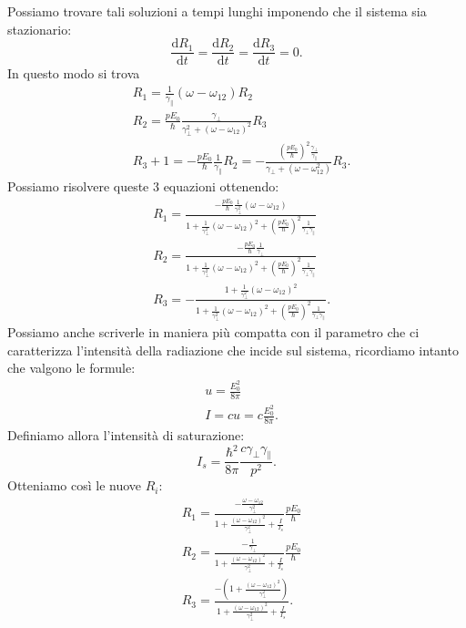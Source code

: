 Possiamo trovare tali soluzioni a tempi lunghi imponendo che il sistema sia stazionario:
\[
\frac{\text{d} R_1}{\text{d} t} =\frac{\text{d} R_2}{\text{d} t} = 
\frac{\text{d} R_3}{\text{d} t} =0
.\] 
In questo modo si trova 
\[\begin{aligned}
    &R_1 = \frac{1}{\gamma_\parallel}\left(\omega-\omega_{12}\right)R_2\\
    &R_2=\frac{pE_0}{\hbar }
    \frac{\gamma_\perp}{\gamma_\perp^2+\left(\omega-\omega_{12}\right)^2}R_3\\
    &R_3+1=-\frac{pE_0}{\hbar  }\frac{1}{\gamma_\parallel}R_2 =
    -\frac{\left(\frac{pE_0}{\hbar }\right)^2
	\frac{\gamma_\perp}
    {\gamma_\parallel}}{\gamma_\perp +\left(\omega-\omega_{12}^2\right)}R_3
.\end{aligned}\]
Possiamo risolvere queste 3 equazioni ottenendo:
\[\begin{aligned}
    &R_1= \frac{-\frac{pE_0}{\hbar  }\frac{1}{\gamma_\perp^2}
    \left(\omega-\omega_{12}\right)}
    {1+\frac{1}{\gamma_\perp^2}\left(\omega-\omega_{12}\right)^2 
    + \left(\frac{pE_0}{\hbar }\right)^2 
	\frac{1}{\gamma_\perp\gamma_\parallel}}\\
    &R_2 = \frac{- \frac{pE_0}{\hbar }\frac{1}{\gamma_\perp}}
{1+\frac{1}{\gamma_\perp^2}\left(\omega-\omega_{12}\right)^2 
    + \left(\frac{pE_0}{\hbar }\right)^2 
	\frac{1}{\gamma_\perp\gamma_\parallel}}\\
    &R_3 = - \frac{1+ \frac{1}{\gamma_\perp^2}\left(\omega-\omega_{12}\right)^2}
    {1+\frac{1}{\gamma_\perp^2}\left(\omega-\omega_{12}\right)^2 
    + \left(\frac{pE_0}{\hbar }\right)^2 
	\frac{1}{\gamma_\perp\gamma_\parallel}}
.\end{aligned}\]
Possiamo anche scriverle in maniera più compatta con il parametro che ci caratterizza l'intensità della radiazione che incide sul sistema, ricordiamo intanto che valgono le formule:
\[\begin{aligned}
&u = \frac{E_0^2}{8\pi}\\
&I = cu = c \frac{E_0^2}{8\pi}
.\end{aligned}\]
Definiamo allora l'intensità di saturazione:
\[
I_s = \frac{\hbar ^2}{8\pi}\frac{c\gamma_\perp\gamma_\parallel}{p^2}
.\] 
Otteniamo così le nuove $R_i$:
\[\begin{aligned}
    &R_1= \frac{-\frac{\omega-\omega_{12}}{\gamma_\perp^2}}
    {1+ \frac{\left(\omega-\omega_{12}\right)^2}{\gamma_\perp^2}
    + \frac{I}{I_s}} 
    \frac{pE_0}{\hbar }\\
    &R_2 = \frac{-\frac{1}{\gamma_\perp}}
    {1+ \frac{\left(\omega-\omega_{12}\right)^2}{\gamma_\perp^2}
    + \frac{I}{I_s}}
    \frac{pE_0}{\hbar }\\
    &R_3= 
    \frac{-\left(1+ 
    \frac{\left(\omega-\omega_{12}\right)^2}{\gamma_\perp^2}\right)}
    {1+ \frac{\left(\omega-\omega_{12}\right)^2}{\gamma_\perp^2}
    + \frac{I}{I_s}}
.\end{aligned}\]

